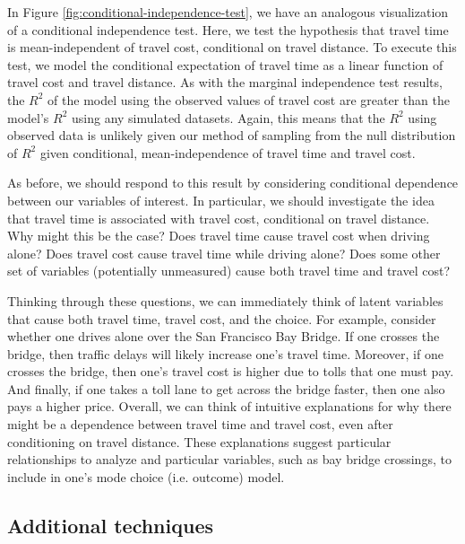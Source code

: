 In Figure \ref{fig:conditional-independence-test}, we have an analogous visualization of a conditional independence test.
Here, we test the hypothesis that travel time is mean-independent of travel cost, conditional on travel distance.
To execute this test, we model the conditional expectation of travel time as a linear function of travel cost and travel distance.
As with the marginal independence test results, the $R^2$ of the model using the observed values of travel cost are greater than the model's $R^2$ using any simulated datasets.
Again, this means that the $R^2$ using observed data is unlikely given our method of sampling from the null distribution of $R^2$ given conditional, mean-independence of travel time and travel cost.

As before, we should respond to this result by considering conditional dependence between our variables of interest.
In particular, we should investigate the idea that travel time is associated with travel cost, conditional on travel distance.
Why might this be the case?
Does travel time cause travel cost when driving alone?
Does travel cost cause travel time while driving alone?
Does some other set of variables (potentially unmeasured) cause both travel time and travel cost?

Thinking through these questions, we can immediately think of latent variables that cause both travel time, travel cost, and the choice.
For example, consider whether one drives alone over the San Francisco Bay Bridge.
If one crosses the bridge, then traffic delays will likely increase one's travel time.
Moreover, if one crosses the bridge, then one's travel cost is higher due to tolls that one must pay.
And finally, if one takes a toll lane to get across the bridge faster, then one also pays a higher price.
Overall, we can think of intuitive explanations for why there might be a dependence between travel time and travel cost, even after conditioning on travel distance.
These explanations suggest particular relationships to analyze and particular variables, such as bay bridge crossings, to include in one's mode choice (i.e. outcome) model.

\subsection{Additional techniques}

